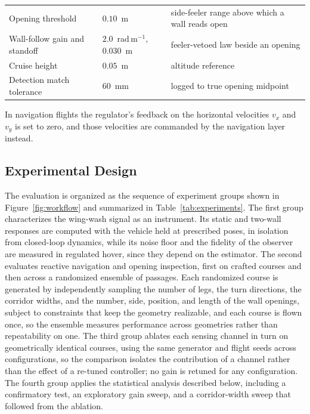 \documentclass[final,5p,times]{elsarticle}
\begin{document}
\begin{table}[t]
\begin{threeparttable}
\begin{tabular*}{\textwidth}{@{\extracolsep{\fill}}lll@{}}
Opening threshold & $0.10$~m & side-feeler range above which a wall reads open \\
Wall-follow gain and standoff & $2.0$~rad\,m$^{-1}$, $0.030$~m & feeler-vetoed law beside an opening \\
Cruise height & $0.05$~m & altitude reference \\
Detection match tolerance & $60$~mm & logged to true opening midpoint \\
\bottomrule
\end{tabular*}
\begin{tablenotes}\footnotesize
\item[a] In navigation flights the regulator's feedback on the horizontal velocities $v_x$ and $v_y$ is set to zero, and those velocities are commanded by the navigation layer instead.
\end{tablenotes}
\end{threeparttable}
\end{table}

\subsection{Experimental Design}
\label{sec:method_experiments}

The evaluation is organized as the sequence of experiment groups shown in Figure~\ref{fig:workflow} and summarized in Table~\ref{tab:experiments}. The first group characterizes the wing-wash signal as an instrument. Its static and two-wall responses are computed with the vehicle held at prescribed poses, in isolation from closed-loop dynamics, while its noise floor and the fidelity of the observer are measured in regulated hover, since they depend on the estimator. The second evaluates reactive navigation and opening inspection, first on crafted courses and then across a randomized ensemble of passages. Each randomized course is generated by independently sampling the number of legs, the turn directions, the corridor widths, and the number, side, position, and length of the wall openings, subject to constraints that keep the geometry realizable, and each course is flown once, so the ensemble measures performance across geometries rather than repeatability on one. The third group ablates each sensing channel in turn on geometrically identical courses, using the same generator and flight seeds across configurations, so the comparison isolates the contribution of a channel rather than the effect of a re-tuned controller; no gain is retuned for any configuration. The fourth group applies the statistical analysis described below, including a confirmatory test, an exploratory gain sweep, and a corridor-width sweep that followed from the ablation.
\end{document}
